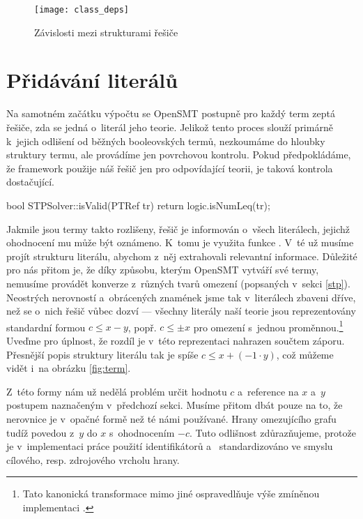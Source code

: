 \begin{figure}
	\centering
	\texttt{[image: class\_deps]}
	\caption{Závislosti mezi strukturami řešiče}
	\label{fig:deps}
\end{figure}

\section{Přidávání literálů}\label{add}

Na samotném začátku výpočtu se OpenSMT postupně pro každý term zeptá řešiče, zda se jedná o~literál jeho teorie. Jelikož tento proces slouží primárně k~jejich odlišení od běžných booleovských termů, nezkoumáme do hloubky struktury termu, ale provádíme jen povrchovou kontrolu. Pokud předpokládáme, že framework použije náš řešič jen pro odpovídající teorii, je taková kontrola dostačující.
\begin{code}
bool STPSolver::isValid(PTRef tr) { return logic.isNumLeq(tr); }
\end{code}

Jakmile jsou termy takto rozlišeny, řešič je informován o~všech literálech, jejichž ohodnocení mu může být oznámeno. K~tomu je využita funkce . V~té už musíme projít strukturu literálu, abychom z~něj extrahovali relevantní informace. Důležité pro nás přitom je, že díky způsobu, kterým OpenSMT vytváří své termy, nemusíme provádět konverze z~různých tvarů omezení (popsaných v~sekci \ref{stp}). Neostrých nerovností a~obrácených znamének jsme tak v~literálech zbaveni dříve, než se o~nich řešič vůbec dozví --- všechny literály naší teorie jsou reprezentovány standardní formou $c \leq x - y$, popř. $c \leq \pm x$ pro omezení s~jednou proměnnou.\footnote{Tato kanonická transformace mimo jiné ospravedlňuje výše zmíněnou implementaci .} Uveďme pro úplnost, že rozdíl je v~této reprezentaci nahrazen součtem záporu. Přesnější popis struktury literálu tak je spíše $c \leq x + (-1 \cdot y)$, což můžeme vidět i~na obrázku \ref{fig:term}.

Z~této formy nám už nedělá problém určit hodnotu $c$ a~reference na $x$ a~$y$ postupem naznačeným v~předchozí sekci. Musíme přitom dbát pouze na to, že nerovnice je v~opačné formě než té námi používané. Hrany omezujícího grafu tudíž povedou z~$y$ do $x$ s~ohodnocením $-c$. Tuto odlišnost zdůrazňujeme, protože je v~implementaci práce použití identifikátorů  a~ standardizováno ve smyslu cílového, resp. zdrojového vrcholu hrany.

